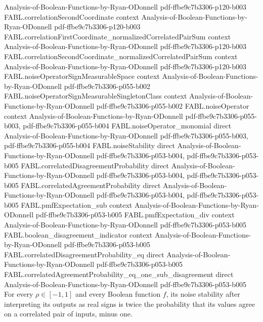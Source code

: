 \begin{theorem}
  {Analysis-of-Boolean-Functions-by-Ryan-ODonnell}
  {pdf-ffbe9c7b3306-p120-b003}
\proofstep
  {FABL.correlationSecondCoordinate}
  {context}
  {Analysis-of-Boolean-Functions-by-Ryan-ODonnell}
  {pdf-ffbe9c7b3306-p120-b003}
\proofstep
  {FABL.correlationFirstCoordinate_normalizedCorrelatedPairSum}
  {context}
  {Analysis-of-Boolean-Functions-by-Ryan-ODonnell}
  {pdf-ffbe9c7b3306-p120-b003}
\proofstep
  {FABL.correlationSecondCoordinate_normalizedCorrelatedPairSum}
  {context}
  {Analysis-of-Boolean-Functions-by-Ryan-ODonnell}
  {pdf-ffbe9c7b3306-p120-b003}
\proofstep
  {FABL.noiseOperatorSignMeasurableSpace}
  {context}
  {Analysis-of-Boolean-Functions-by-Ryan-ODonnell}
  {pdf-ffbe9c7b3306-p055-b002}
\proofstep
  {FABL.noiseOperatorSignMeasurableSingletonClass}
  {context}
  {Analysis-of-Boolean-Functions-by-Ryan-ODonnell}
  {pdf-ffbe9c7b3306-p055-b002}
\proofstep
  {FABL.noiseOperator}
  {context}
  {Analysis-of-Boolean-Functions-by-Ryan-ODonnell}
  {pdf-ffbe9c7b3306-p055-b003,
    pdf-ffbe9c7b3306-p055-b004}
\proofstep
  {FABL.noiseOperator_monomial}
  {direct}
  {Analysis-of-Boolean-Functions-by-Ryan-ODonnell}
  {pdf-ffbe9c7b3306-p055-b003,
    pdf-ffbe9c7b3306-p055-b004}
\proofstep
  {FABL.noiseStability}
  {direct}
  {Analysis-of-Boolean-Functions-by-Ryan-ODonnell}
  {pdf-ffbe9c7b3306-p053-b004,
    pdf-ffbe9c7b3306-p053-b005}
\proofstep
  {FABL.correlatedDisagreementProbability}
  {direct}
  {Analysis-of-Boolean-Functions-by-Ryan-ODonnell}
  {pdf-ffbe9c7b3306-p053-b004,
    pdf-ffbe9c7b3306-p053-b005}
\proofstep
  {FABL.correlatedAgreementProbability}
  {direct}
  {Analysis-of-Boolean-Functions-by-Ryan-ODonnell}
  {pdf-ffbe9c7b3306-p053-b004,
    pdf-ffbe9c7b3306-p053-b005}
\proofstep
  {FABL.pmfExpectation_sub}
  {context}
  {Analysis-of-Boolean-Functions-by-Ryan-ODonnell}
  {pdf-ffbe9c7b3306-p053-b005}
\proofstep
  {FABL.pmfExpectation_div}
  {context}
  {Analysis-of-Boolean-Functions-by-Ryan-ODonnell}
  {pdf-ffbe9c7b3306-p053-b005}
\proofstep
  {FABL.boolean_disagreement_indicator}
  {context}
  {Analysis-of-Boolean-Functions-by-Ryan-ODonnell}
  {pdf-ffbe9c7b3306-p053-b005}
\proofstep
  {FABL.correlatedDisagreementProbability_eq}
  {direct}
  {Analysis-of-Boolean-Functions-by-Ryan-ODonnell}
  {pdf-ffbe9c7b3306-p053-b005}
\proofstep
  {FABL.correlatedAgreementProbability_eq_one_sub_disagreement}
  {direct}
  {Analysis-of-Boolean-Functions-by-Ryan-ODonnell}
  {pdf-ffbe9c7b3306-p053-b005}
For every $\rho\in[-1,1]$ and every Boolean function $f$, its noise stability after
interpreting its outputs as real signs is twice the probability that its values agree on
a correlated pair of inputs, minus one.
\end{theorem}
